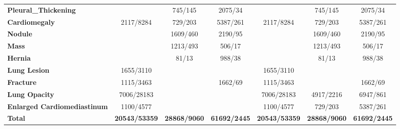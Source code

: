 \documentclass[preprint,3p,times, review]{elsarticle}
\begin{document}
\begin{table}[]
{\begin{tabular}{lcccccc}
\textbf{Pleural\_Thickening}        &               & 745/145      & 2075/34     &               & 745/145      & 2075/34     \\
\textbf{Cardiomegaly}               & 2117/8284     & 729/203      & 5387/261    & 2117/8284     & 729/203      & 5387/261    \\
\textbf{Nodule}                     &               & 1609/460     & 2190/95     &               & 1609/460     & 2190/95     \\
\textbf{Mass}                       &               & 1213/493     & 506/17      &               & 1213/493     & 506/17      \\
\textbf{Hernia}                     &               & 81/13        & 988/38      &               & 81/13        & 988/38      \\
\textbf{Lung Lesion}                & 1655/3110     &              &             & 1655/3110     &              &             \\
\textbf{Fracture}                   & 1115/3463     &              & 1662/69     & 1115/3463     &              & 1662/69     \\
\textbf{Lung Opacity}               & 7006/28183    &              &             & 7006/28183    & 4917/2216    & 6947/861    \\
\textbf{Enlarged Cardiomediastinum} & 1100/4577     &              &             & 1100/4577     & 729/203      & 5387/261    \\
\textbf{Total} & \textbf{20543/53359} & \textbf{28868/9060} & \textbf{61692/2445} & \textbf{20543/53359} & \textbf{28868/9060} & \textbf{61692/2445}
\end{tabular}
}\label{Taxonomy.Table.1.Dataset}
\end{table}
\end{document}
